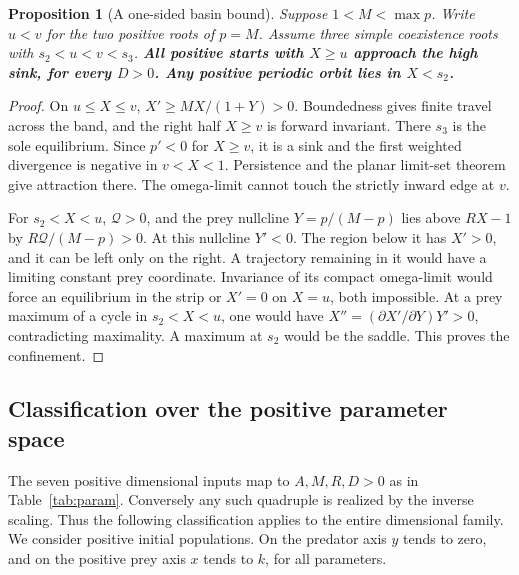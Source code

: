 \documentclass[12pt,a4paper,twoside,fleqn]{article}
\theoremstyle{journal}
\newtheorem{proposition}{Proposition}
\newcommand{\claim}[1]{{\normalfont\bfseries\boldmath #1}}
\newcommand{\Q}{\mathcal Q}
\begin{document}
\begin{proposition}[A one-sided basin bound]\label{prop:strip}
Suppose \(1<M<\max p\). Write \(u<v\) for the two positive roots of \(p=M\). Assume three simple coexistence roots with \(s_2<u<v<s_3\).
\claim{All positive starts with \(X\ge u\) approach the high sink, for every \(D>0\). Any positive periodic orbit lies in \(X<s_2\).}
\end{proposition}
\begin{proof}
On \(u\le X\le v\), \(X'\ge MX/(1+Y)>0\). Boundedness gives finite travel across the band, and the right half \(X\ge v\) is forward invariant. There \(s_3\) is the sole equilibrium. Since \(p'<0\) for \(X\ge v\), it is a sink and the first weighted divergence is negative in \(v<X<1\). Persistence and the planar limit-set theorem give attraction there. The omega-limit cannot touch the strictly inward edge at \(v\).

For \(s_2<X<u\), \(\Q>0\), and the prey nullcline \(Y=p/(M-p)\) lies above \(RX-1\) by \(R\Q/(M-p)>0\). At this nullcline \(Y'<0\). The region below it has \(X'>0\), and it can be left only on the right. A trajectory remaining in it would have a limiting constant prey coordinate. Invariance of its compact omega-limit would force an equilibrium in the strip or \(X'=0\) on \(X=u\), both impossible. At a prey maximum of a cycle in \(s_2<X<u\), one would have \(X''=(\partial X'/\partial Y)Y'>0\), contradicting maximality. A maximum at \(s_2\) would be the saddle. This proves the confinement.
\end{proof}
\subsection{Classification over the positive parameter space}\label{sec:globalmap}
The seven positive dimensional inputs map to \(A,M,R,D>0\) as in Table~\ref{tab:param}. Conversely any such quadruple is realized by the inverse scaling. Thus the following classification applies to the entire dimensional family. We consider positive initial populations. On the predator axis \(y\) tends to zero, and on the positive prey axis \(x\) tends to \(k\), for all parameters.
\end{document}
